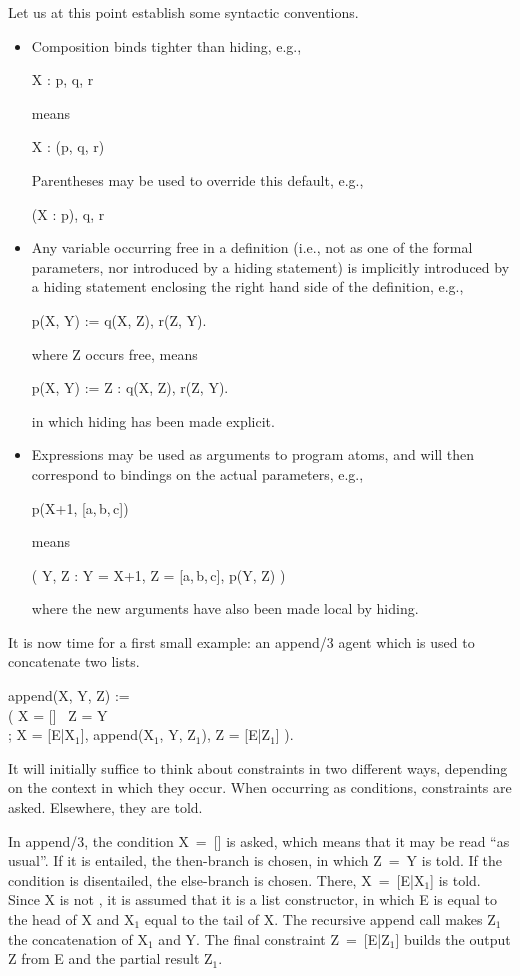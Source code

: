 Let us at this point establish some syntactic conventions.
%
\begin{itemize}
\item
Composition binds tighter than hiding, e.g.,
%
\begin{progex}
X : p, q, r
\end{progex}%
%
means
%
\begin{progex}
X : (p, q, r)
\end{progex}%
%
Parentheses may be used to override this default, e.g.,
%
\begin{progex}
(X : p), q, r
\end{progex}%
%
\item
Any variable occurring free in a definition (i.e., not as one of the
formal parameters, nor introduced by a hiding statement) is implicitly
introduced by a hiding statement enclosing the right hand side of the
definition, e.g.,
%
\begin{progex}
p(X, Y) := q(X, Z), r(Z, Y).
\end{progex}%
%
where Z occurs free, means
%
\begin{progex}
p(X, Y) := Z : q(X, Z), r(Z, Y).
\end{progex}%
%
in which hiding has been made explicit.

\item
Expressions may be used as arguments to program atoms, and will then
correspond to bindings on the actual parameters, e.g.,
%
\begin{progex}
p(X+1, [a,\,b,\,c])
\end{progex}%
%
means
%
\begin{progex}
( Y, Z : Y = X+1, Z = [a,\,b,\,c], p(Y, Z) )
\end{progex}%
%
where the new arguments have also been made local by hiding.
\end{itemize}
%
It is now time for a first small example: an append/3 agent which is
used to concatenate two lists.
%
\begin{program}
append(X, Y, Z) := \\
\>\>( X = [] \cond\ Z = Y \\
\>\>; X = [E|X$_1$], append(X$_1$, Y, Z$_1$),  Z = [E|Z$_1$] ).
\end{program}%
%
It will initially suffice to think about constraints in two different
ways, depending on the context in which they occur.  When occurring as
conditions, constraints are asked.  Elsewhere, they are told.

In append/3, the condition {\prog X~=~[]} is asked, which means that
it may be read ``as usual''.  If it is entailed, the then-branch is
chosen, in which {\prog Z~=~Y} is told.  If the condition is
disentailed, the else-branch is chosen.  There, {\prog X~=~[E|X$_1$]}
is told.  Since {\prog X} is not {\prog []}, it is assumed that it is
a list constructor, in which E is equal to the head of {\prog X} and
{\prog X$_1$} equal to the tail of {\prog X.}  The recursive append
call makes {\prog Z$_1$} the concatenation of {\prog X$_1$} and {\prog
Y.}  The final constraint {\prog Z~=~[E|Z$_1$]} builds the output
{\prog Z} from {\prog E} and the partial result {\prog Z$_1$}.

